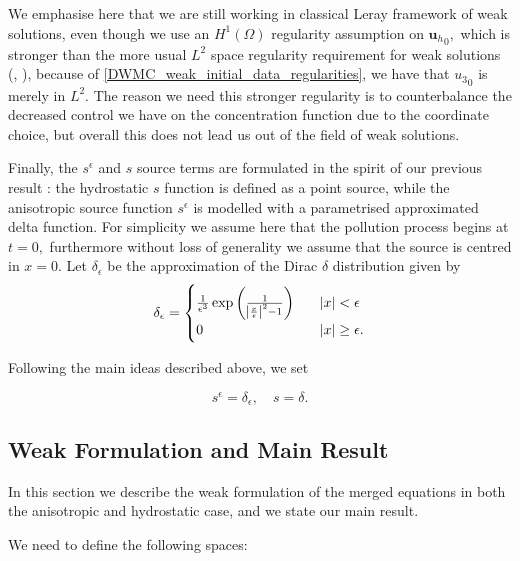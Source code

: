 \documentclass[11pt, a4paper]{article}
\begin{document}
We emphasise here that we are still working in classical Leray framework of weak solutions, even though we use an $H^1(\Omega)$ regularity assumption on ${\mathbf{u}_h}_0,$ which is stronger than the more usual $L^2$ space regularity requirement for weak solutions (\cite{azerad2001mathematical}, \cite{pollatmws2019}), because of \eqref{DWMC_weak_initial_data_regularities}, we have that  ${u_3}_0$ is merely in  $L^2$. The reason we need this stronger regularity is to counterbalance the decreased control we have on the concentration function due to the coordinate choice, but overall this does not lead us out of the field of weak solutions.

Finally, the $s^\epsilon$ and $s$ source terms are formulated in the spirit of our previous result \cite{pollatmws2019}: the hydrostatic $s$ function is defined as a point source, while the anisotropic source function $s^\epsilon$ is modelled with a parametrised approximated delta function. For simplicity we assume here that the pollution process begins at $t = 0,$ furthermore without loss of generality we assume that the source is centred in $x=0$.
Let $\delta_\epsilon$ be the approximation of the Dirac $\delta$ distribution given by 
%
\begin{equation} \label{delta_eps_source_def}
\delta_\epsilon = 
\begin{cases}
\frac{1}{\epsilon^3} \exp{\bigg ( \frac{1}{\abs{{\frac{x}{\epsilon}}}^2-1} \bigg ) } &\quad \abs{x} < \epsilon \\
0 &\quad \abs{x} \geq \epsilon. \\
\end{cases}
\end{equation}

Following the main ideas described above, we set

\begin{equation}
s^\epsilon = \delta_\epsilon, \quad s = \delta.
\end{equation}

\subsection{Weak Formulation and Main Result} \label{weakformulationmainresult}

In this section we describe the weak formulation of the merged equations in both the anisotropic and hydrostatic case, and we state our main result.

We need to define the following spaces:
\end{document}
